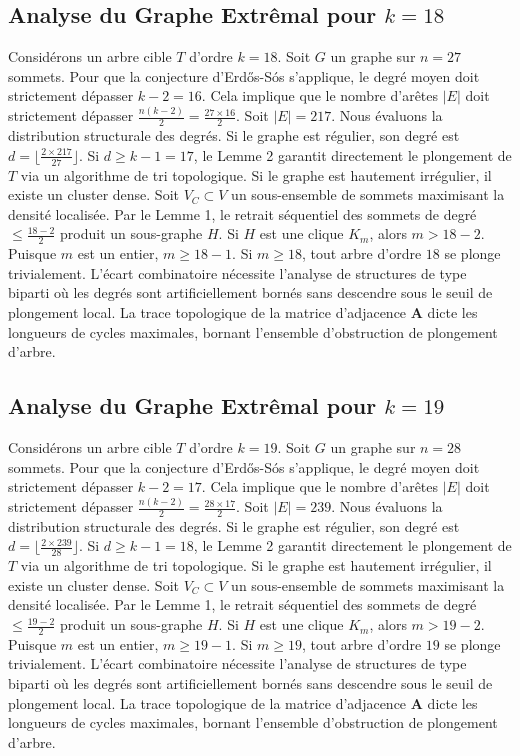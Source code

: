 \documentclass[11pt,a4paper]{article}
\begin{document}
\subsection{Analyse du Graphe Extr\^emal pour $k=18$}
Consid\'erons un arbre cible $T$ d'ordre $k=18$.
Soit $G$ un graphe sur $n=27$ sommets.
Pour que la conjecture d'Erd\H{o}s-S\'os s'applique, le degr\'e moyen doit strictement d\'epasser $k-2 = 16$.
Cela implique que le nombre d'ar\^etes $|E|$ doit strictement d\'epasser $\frac{n(k-2)}{2} = \frac{27 \times 16}{2}$.
Soit $|E| = 217$.
Nous \'evaluons la distribution structurale des degr\'es. Si le graphe est r\'egulier, son degr\'e est $d = \lfloor \frac{2 \times 217}{27} \rfloor$.
Si $d \geq k-1 = 17$, le Lemme 2 garantit directement le plongement de $T$ via un algorithme de tri topologique.
Si le graphe est hautement irr\'egulier, il existe un cluster dense. Soit $V_C \subset V$ un sous-ensemble de sommets maximisant la densit\'e localis\'ee.
Par le Lemme 1, le retrait s\'equentiel des sommets de degr\'e $\leq \frac{18-2}{2}$ produit un sous-graphe $H$.
Si $H$ est une clique $K_{m}$, alors $m > 18-2$. Puisque $m$ est un entier, $m \geq 18-1$. Si $m \geq 18$, tout arbre d'ordre $18$ se plonge trivialement.
L'\'ecart combinatoire n\'ecessite l'analyse de structures de type biparti o\`u les degr\'es sont artificiellement born\'es sans descendre sous le seuil de plongement local. La trace topologique de la matrice d'adjacence $\mathbf{A}$ dicte les longueurs de cycles maximales, bornant l'ensemble d'obstruction de plongement d'arbre.


\subsection{Analyse du Graphe Extr\^emal pour $k=19$}
Consid\'erons un arbre cible $T$ d'ordre $k=19$.
Soit $G$ un graphe sur $n=28$ sommets.
Pour que la conjecture d'Erd\H{o}s-S\'os s'applique, le degr\'e moyen doit strictement d\'epasser $k-2 = 17$.
Cela implique que le nombre d'ar\^etes $|E|$ doit strictement d\'epasser $\frac{n(k-2)}{2} = \frac{28 \times 17}{2}$.
Soit $|E| = 239$.
Nous \'evaluons la distribution structurale des degr\'es. Si le graphe est r\'egulier, son degr\'e est $d = \lfloor \frac{2 \times 239}{28} \rfloor$.
Si $d \geq k-1 = 18$, le Lemme 2 garantit directement le plongement de $T$ via un algorithme de tri topologique.
Si le graphe est hautement irr\'egulier, il existe un cluster dense. Soit $V_C \subset V$ un sous-ensemble de sommets maximisant la densit\'e localis\'ee.
Par le Lemme 1, le retrait s\'equentiel des sommets de degr\'e $\leq \frac{19-2}{2}$ produit un sous-graphe $H$.
Si $H$ est une clique $K_{m}$, alors $m > 19-2$. Puisque $m$ est un entier, $m \geq 19-1$. Si $m \geq 19$, tout arbre d'ordre $19$ se plonge trivialement.
L'\'ecart combinatoire n\'ecessite l'analyse de structures de type biparti o\`u les degr\'es sont artificiellement born\'es sans descendre sous le seuil de plongement local. La trace topologique de la matrice d'adjacence $\mathbf{A}$ dicte les longueurs de cycles maximales, bornant l'ensemble d'obstruction de plongement d'arbre.
\end{document}
